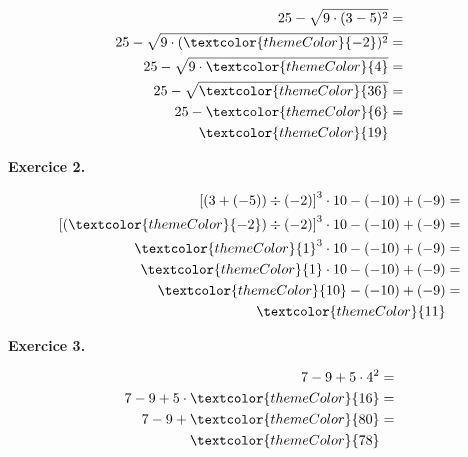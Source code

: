 {\vspace{-30pt}\color{black}
\begin{align*}
25 - \sqrt{9 \cdot (3-5)^2} &= \\
25 - \sqrt{9 \cdot (\textcolor{themeColor}{-2})^2} &= \\
25 - \sqrt{9 \cdot \textcolor{themeColor}{4}} &= \\
25 - \sqrt{\textcolor{themeColor}{36}} &= \\
25 - \textcolor{themeColor}{6} &= \\
\textcolor{themeColor}{19}
\end{align*}
}

\vspace{30pt}
{\bfseries\color{themeColor}Exercice 2.} 

{\vspace{-30pt}\color{black}
\begin{align*}
\left[\left(3 + \left(-5\right)\right) \div \left(-2\right)\right]^3 \cdot 10 - \left(-10\right) + \left(-9\right) &=\\
\left[\left(\textcolor{themeColor}{-2}\right) \div \left(-2\right)\right]^3 \cdot 10 - \left(-10\right) + \left(-9\right) &= \\
\textcolor{themeColor}{1}^3 \cdot 10 - \left(-10\right) + \left(-9\right) &= \\
\textcolor{themeColor}{1} \cdot 10 - \left(-10\right) + \left(-9\right) &= \\
\textcolor{themeColor}{10} - \left(-10\right) + \left(-9\right) &= \\
\textcolor{themeColor}{11}
\end{align*}
}


\newpage
{\bfseries\color{themeColor}Exercice 3.} 

{\vspace{-30pt}\color{black}
\begin{align*}
7 - 9 + 5 \cdot 4^2 &= \\
7 - 9 + 5 \cdot \textcolor{themeColor}{16} &= \\
7 - 9 + \textcolor{themeColor}{80} &= \\
\textcolor{themeColor}{78}
\end{align*}
}

